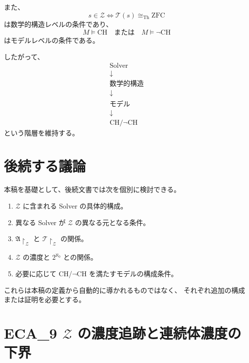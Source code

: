 \documentclass[a4paper,11pt]{article}
\begin{document}
また、
\[
s\in\mathcal{Z}
\iff
\mathcal{T}(s)\cong_{\mathrm{Th}}\mathrm{ZFC}
\]
は数学的構造レベルの条件であり、
\[
M\models\mathrm{CH}
\quad\text{または}\quad
M\models\neg\mathrm{CH}
\]
はモデルレベルの条件である。

したがって、
\[
\boxed{
\begin{array}{c}
\text{Solver}\\
\downarrow\\
\text{数学的構造}\\
\downarrow\\
\text{モデル}\\
\downarrow\\
\mathrm{CH}/\neg\mathrm{CH}
\end{array}}
\]
という階層を維持する。

\section{後続する議論}

本稿を基礎として、後続文書では次を個別に検討できる。

\begin{enumerate}
\item $\mathcal{Z}$ に含まれる Solver の具体的構成。
\item 異なる Solver が $\mathcal{Z}$ の異なる元となる条件。
\item $\mathfrak{A}\restriction_{\mathcal{Z}}$ と
$\mathcal{T}\restriction_{\mathcal{Z}}$ の関係。
\item $\mathcal{Z}$ の濃度と $2^{\aleph_0}$ との関係。
\item 必要に応じて CH/$\neg$CH を満たすモデルの構成条件。
\end{enumerate}

これらは本稿の定義から自動的に導かれるものではなく、
それぞれ追加の構成または証明を必要とする。

\section{ECA_9 $\mathcal{Z}$ の濃度追跡と連続体濃度の下界}

\begin{abstract}
本稿では、ECA_6 および ECA_7 で確定した Solver、公理選択空間、数学的構造写像、$\mathcal{Z}$ の定義を前提として、
$|\mathcal{Z}|\geq 2^{\aleph_0}$ をどのような条件の下で導出できるかを整理する。
これまでの検証では、$\mathcal{P}(\mathbb{N})\hookrightarrow\mathcal{P}(\mathcal{A}_0)$ は構成できる一方、
$\mathcal{P}(\mathbb{N})\hookrightarrow I$ や $\mathcal{P}(\mathbb{N})\hookrightarrow\mathcal{Z}$ は現行定義だけからは導出できないことを確認している。
そこで本稿では、$\mathcal{Z}$ 内に連続体濃度の異なる Solver を実際に構成するための条件を明示し、その条件から得られる濃度下界を定理として記述する。
CH の証明は本稿の目的としない。
\end{abstract}
\end{document}
